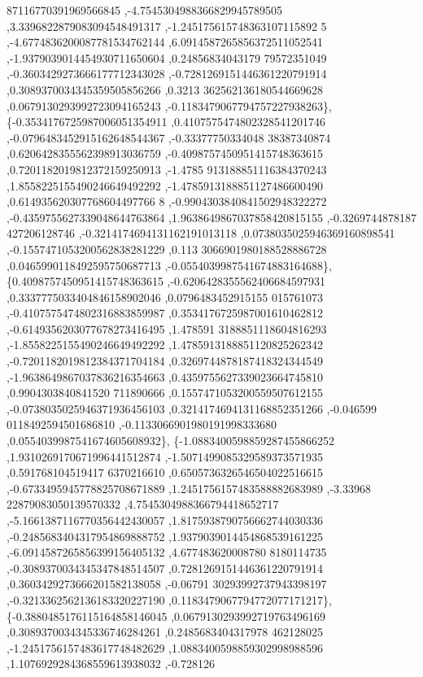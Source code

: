 \begin{DoxyCode}
      87116770391969566845 ,-4.7545304988366829945789505 ,3.3396822879083094548491317 ,-1.245175615748363107115892
      5 ,-4.6774836200087781534762144 ,6.0914587265856372511052541 ,-1.9379039014454930711650604 ,0.24856834043179
      79572351049 ,-0.3603429273666177712343028 ,-0.7281269151446361220791914 ,0.3089370034345359505856266 ,0.3213
      362562136180544669628 ,0.0679130293992723094165243 ,-0.1183479067794757227938263\},
\{-0.3534176725987006051354911 ,0.4107575474802328541201746 ,-0.0796483452915162648544367 ,-0.33377750334048
      38387340874 ,0.6206428355562398913036759 ,-0.4098757450951415748363615 ,0.7201182019812372159250913 ,-1.4785
      913188851116384370243 ,1.8558225155490246649492292 ,-1.4785913188851127486600490 ,0.614935620307768604497766
      8 ,-0.9904303840841502948322272 ,-0.4359755627339048644763864 ,1.9638649867037858420815155 ,-0.3269744878187
      427206128746 ,-0.3214174694131162191013118 ,0.0738035025946369160898541 ,-0.1557471053200562838281229 ,0.113
      3066901980188528886728 ,0.0465990118492595750687713 ,-0.0554039987541674883164688\},
\{0.4098757450951415748363615 ,-0.6206428355562406684597931 ,0.3337775033404846158902046 ,0.0796483452915155
      015761073 ,-0.4107575474802316883859987 ,0.3534176725987001610462812 ,-0.6149356203077678273416495 ,1.478591
      3188851118604816293 ,-1.8558225155490246649492292 ,1.4785913188851120825262342 ,-0.7201182019812384371704184
       ,0.3269744878187418324344549 ,-1.9638649867037836216354663 ,0.4359755627339023664745810 ,0.9904303840841520
      711890666 ,0.1557471053200559507612155 ,-0.0738035025946371936456103 ,0.3214174694131168852351266 ,-0.046599
      0118492594501686810 ,-0.1133066901980191998333680 ,0.0554039987541674605608932\},
\{-1.0883400598859287455866252 ,1.9310269170671996441512874 ,-1.5071499085329589373571935 ,0.591768104519417
      6370216610 ,0.6505736326546504022516615 ,-0.6733495945778825708671889 ,1.2451756157483588882683989 ,-3.33968
      22879083050139570332 ,4.7545304988366794418652717 ,-5.1661387116770356442430057 ,1.8175938790756662744030336
       ,-0.2485683404317954869888752 ,1.9379039014454868539161225 ,-6.0914587265856399156405132 ,4.677483620008780
      8180114735 ,-0.3089370034345347848514507 ,0.7281269151446361220791914 ,0.3603429273666201582138058 ,-0.06791
      30293992737943398197 ,-0.3213362562136183320227190 ,0.1183479067794772077171217\},
\{-0.3880485176115164858146045 ,0.0679130293992719763496169 ,0.3089370034345336746284261 ,0.2485683404317978
      462128025 ,-1.2451756157483617748482629 ,1.0883400598859302998988596 ,1.1076929284368559613938032 ,-0.728126

\end{DoxyCode}
